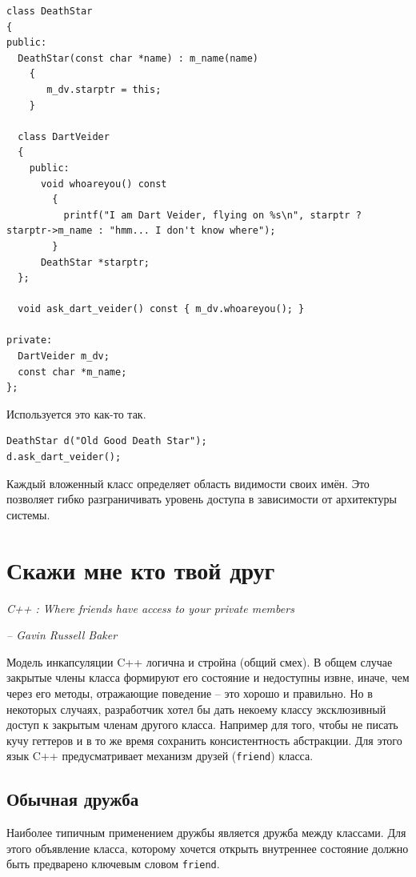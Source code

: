 \documentclass[a4paper,12pt,oneside]{book}
\begin{document}
\begin{lstlisting}
class DeathStar
{
public:
  DeathStar(const char *name) : m_name(name)
    {
       m_dv.starptr = this;
    }

  class DartVeider
  {
    public:
      void whoareyou() const
        {
          printf("I am Dart Veider, flying on %s\n", starptr ? starptr->m_name : "hmm... I don't know where");
        }
      DeathStar *starptr;    
  };

  void ask_dart_veider() const { m_dv.whoareyou(); }

private:
  DartVeider m_dv;
  const char *m_name;
};
\end{lstlisting}

Используется это как-то так.

\begin{lstlisting}
DeathStar d("Old Good Death Star");
d.ask_dart_veider();
\end{lstlisting}

Каждый вложенный класс определяет область видимости своих имён. Это позволяет гибко разграничивать уровень доступа в зависимости от архитектуры системы.

\pagebreak
\section{Скажи мне кто твой друг}\label{WhosYourFriend}

\hfill\textit{C++ : Where friends have access to your private members}{\vspace{0.5em}}

\hfill\textit{-- Gavin Russell Baker}

Модель инкапсуляции C++ логична и стройна (общий смех). В общем случае закрытые члены класса формируют его состояние и недоступны извне, иначе, чем через его методы, отражающие поведение -- это хорошо и правильно. Но в некоторых случаях, разработчик хотел бы дать некоему классу эксклюзивный доступ к закрытым членам другого класса. Например для того, чтобы не писать кучу геттеров и в то же время сохранить консистентность абстракции. Для этого язык C++ предусматривает механизм друзей (\lstinline!friend!) класса.

\subsection{Обычная дружба}

Наиболее типичным применением дружбы является дружба между классами. Для этого объявление класса, которому хочется открыть внутреннее состояние должно быть предварено ключевым словом \lstinline!friend!.
\end{document}
